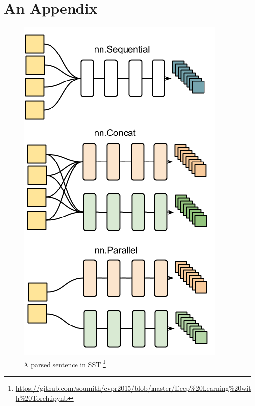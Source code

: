 \chapter{An Appendix}

\begin{figure}
	\begin{minipage}{\textwidth}
		\centering
		\includegraphics[width=0.7\linewidth]{figure/nncontainer}
		\caption[A parsed sentence in SST]{A parsed sentence in SST \footnote{ \url{https://github.com/soumith/cvpr2015/blob/master/Deep\%20Learning\%20with\%20Torch.ipynb}}}
		\label{fig:nncontainer}
	\end{minipage}
\end{figure}